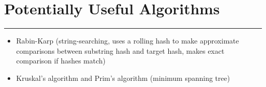 \documentclass[12pt]{article}
\begin{document}
\section*{Potentially Useful Algorithms}
\hrule\vspace{5ex}

\begin{itemize}
  \item Rabin-Karp (string-searching, uses a rolling hash to make approximate comparisons between substring hash and target hash, makes exact comparison if hashes match)
  \item Kruskal's algorithm and Prim's algorithm (minimum spanning tree)
\end{itemize}
\end{document}

